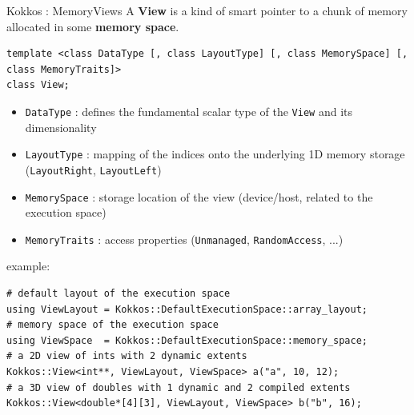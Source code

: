 \begin{frame}[fragile]{Kokkos : Memory}{Views}
  \vspace{0.2cm}
  A \textbf{View} is a kind of smart pointer to a chunk of memory allocated in some \textbf{memory space}.
  \begin{verbatim}
template <class DataType [, class LayoutType] [, class MemorySpace] [, class MemoryTraits]>
class View;
  \end{verbatim}
  \vspace{-0.4cm}
  \begin{itemize}
    \item \verb|DataType| : defines the fundamental scalar type of the \verb|View| and its dimensionality
    \item \verb|LayoutType| : mapping of the indices onto the underlying 1D memory storage (\verb|LayoutRight|, \verb|LayoutLeft|)
    \item \verb|MemorySpace| : storage location of the view (device/host, related to the execution space)
    \item \verb|MemoryTraits| : access properties (\verb|Unmanaged|, \verb|RandomAccess|, ...)
  \end{itemize}

  example:
  \begin{verbatim}
# default layout of the execution space
using ViewLayout = Kokkos::DefaultExecutionSpace::array_layout;
# memory space of the execution space
using ViewSpace  = Kokkos::DefaultExecutionSpace::memory_space;
# a 2D view of ints with 2 dynamic extents
Kokkos::View<int**, ViewLayout, ViewSpace> a("a", 10, 12);
# a 3D view of doubles with 1 dynamic and 2 compiled extents
Kokkos::View<double*[4][3], ViewLayout, ViewSpace> b("b", 16);
  \end{verbatim}
\end{frame}

